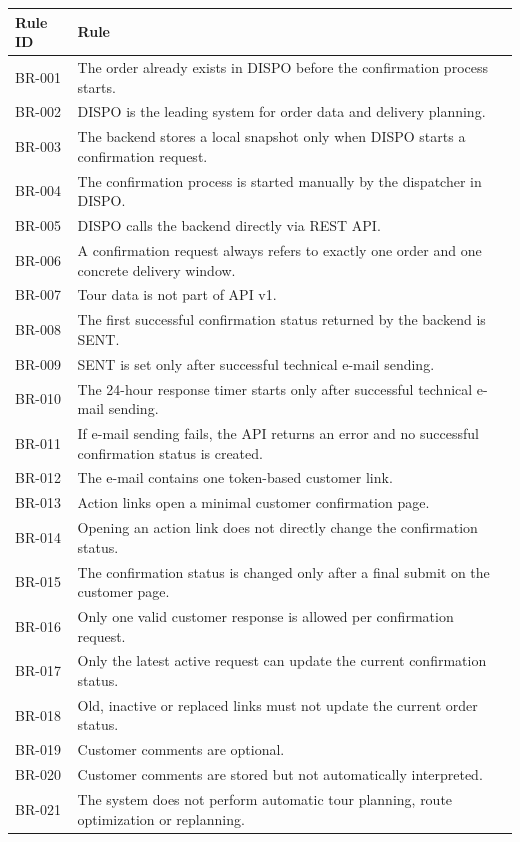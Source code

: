 \documentclass[a4paper,11pt]{article}
\begin{document}
\begin{longtable}{p{2cm}p{11cm}}
	\toprule
	Rule ID & Rule \\
	\midrule
	BR-001 & The order already exists in DISPO before the confirmation process starts. \\
	BR-002 & DISPO is the leading system for order data and delivery planning. \\
	BR-003 & The backend stores a local snapshot only when DISPO starts a confirmation request. \\
	BR-004 & The confirmation process is started manually by the dispatcher in DISPO. \\
	BR-005 & DISPO calls the backend directly via REST API. \\
	BR-006 & A confirmation request always refers to exactly one order and one concrete delivery window. \\
	BR-007 & Tour data is not part of API v1. \\
	BR-008 & The first successful confirmation status returned by the backend is SENT. \\
	BR-009 & SENT is set only after successful technical e-mail sending. \\
	BR-010 & The 24-hour response timer starts only after successful technical e-mail sending. \\
	BR-011 & If e-mail sending fails, the API returns an error and no successful confirmation status is created. \\
	BR-012 & The e-mail contains one token-based customer link. \\
	BR-013 & Action links open a minimal customer confirmation page. \\
	BR-014 & Opening an action link does not directly change the confirmation status. \\
	BR-015 & The confirmation status is changed only after a final submit on the customer page. \\
	BR-016 & Only one valid customer response is allowed per confirmation request. \\
	BR-017 & Only the latest active request can update the current confirmation status. \\
	BR-018 & Old, inactive or replaced links must not update the current order status. \\
	BR-019 & Customer comments are optional. \\
	BR-020 & Customer comments are stored but not automatically interpreted. \\
	BR-021 & The system does not perform automatic tour planning, route optimization or replanning. \\

\end{longtable}
\end{document}
